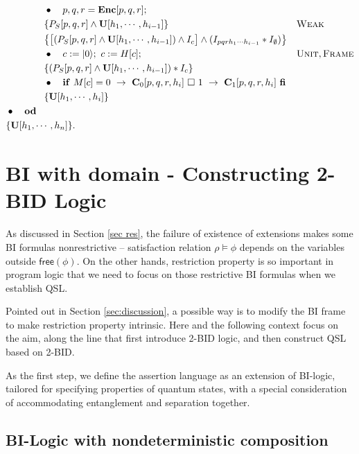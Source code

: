 \documentclass[conference,compsoc, 10pt]{IEEEtran}
\newcommand {\id } {{I}}
\newcommand {\free }[1] {{\mathsf{free}\left(#1\right)}}
\newcommand {\unia } {{\mathbf{U}}}
\newcommand {\prog } {{\mathbf{C}}}
\def\>{\ensuremath{\rangle}}
\begin{document}
\begin{appendices}
\begin{align*}
		&\qquad\qquad \bullet\quad p,q,r = {\bf Enc}[p,q,r]; && \\
		&\qquad\qquad \{P_S[p,q,r]\wedge\unia[h_1,\cdots,h_{i-1}]\} && \textsc{Weak}\\
		&\qquad\qquad \!\left\{\big[(P_S[p,q,r]\wedge\unia[h_1,\cdots,h_{i-1}])\wedge\id_c\big]\wedge(\id_{pqrh_1\cdots h_{i-1}}\ast \id_{\emptyset})\right\} &&\\ 
		&\qquad\qquad \bullet\quad c:= |0\>;\ c:= H[c];  && \textsc{Unit},\textsc{Frame} \\ 
		&\qquad\qquad \{(P_S[p,q,r]\wedge\unia[h_1,\cdots,h_{i-1}])\ast\id_c\} \\
		&\qquad\qquad \bullet\quad {\bf if}\ M[c] = 0\ \rightarrow\ \prog_0[p,q,r,h_i]\ \square \  1\ \rightarrow\ \prog_1[p,q,r,h_i]\ {\bf fi} && \\
		&\qquad\qquad \{\unia[h_1,\cdots,h_i]\} \\
		&\bullet\quad {\bf od} && \\
		&\{\unia[h_1,\cdots,h_n]\}. && 
		\end{align*}
		
		\section{BI with domain - Constructing 2-BID Logic}
		\label{sec 2BID}
		
		As discussed in Section \ref{sec res}, the failure of existence of extensions makes some BI formulas nonrestrictive -- satisfaction relation $\rho\models\phi$ depends on the variables outside $\free{\phi}$. On the other hands, restriction property is so important in program logic that we need to focus on those restrictive BI formulas when we establish QSL. 
		
		Pointed out in Section \ref{sec:discussion}, a possible way is to modify the BI frame to make restriction property intrinsic. Here and the following context focus on the aim, along the line that first introduce 2-BID logic, and then construct QSL based on 2-BID. 
		
		As the first step, we define the assertion language as an extension of BI-logic, tailored for specifying properties of quantum states, with a special consideration of accommodating entanglement and separation together.   
		
		
		\subsection{BI-Logic with nondeterministic composition}
		

\end{appendices}
\end{document}
